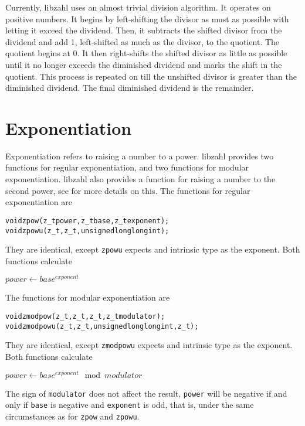 Currently, libzahl uses an almost trivial division
algorithm. It operates on positive numbers. It begins
by left-shifting the divisor as must as possible with
letting it exceed the dividend. Then, it subtracts
the shifted divisor from the dividend and add 1,
left-shifted as much as the divisor, to the quotient.
The quotient begins at 0. It then right-shifts
the shifted divisor as little as possible until
it no longer exceeds the diminished dividend and
marks the shift in the quotient. This process is
repeated on till the unshifted divisor is greater
than the diminished dividend. The final diminished
dividend is the remainder.



\newpage
\section{Exponentiation}
\label{sec:Exponentiation}

Exponentiation refers to raising a number to
a power. libzahl provides two functions for
regular exponentiation, and two functions for
modular exponentiation. libzahl also provides
a function for raising a number to the second
power, see  for
more details on this. The functions for regular
exponentiation are

\begin{alltt}
   void zpow(z_t power, z_t base, z_t exponent);
   void zpowu(z_t, z_t, unsigned long long int);
\end{alltt}

\noindent
They are identical, except {\tt zpowu} expects
and intrinsic type as the exponent. Both functions
calculate

\vspace{1em}
$power \gets base^{exponent}$
\vspace{1em}

\noindent
The functions for modular exponentiation are
\begin{alltt}
   void zmodpow(z_t, z_t, z_t, z_t modulator);
   void zmodpowu(z_t, z_t, unsigned long long int, z_t);
\end{alltt}

\noindent
They are identical, except {\tt zmodpowu} expects
and intrinsic type as the exponent. Both functions
calculate

\vspace{1em}
$power \gets base^{exponent} \mod modulator$
\vspace{1em}

The sign of {\tt modulator} does not affect the
result, {\tt power} will be negative if and only
if {\tt base} is negative and {\tt exponent} is
odd, that is, under the same circumstances as for
{\tt zpow} and {\tt zpowu}.

